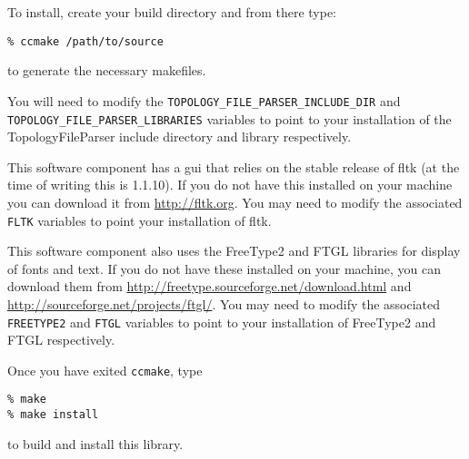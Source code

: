 To install, create your build directory and from there type:

\texttt{\% ccmake /path/to/source}

to generate the necessary makefiles. 

You will need to modify the 
\texttt{TOPOLOGY\_FILE\_PARSER\_INCLUDE\_DIR} and \texttt{TOPOLOGY\_FILE\_PARSER\_LIBRARIES} 
variables to point to your installation of the TopologyFileParser include directory and 
library respectively.

This software component has a gui that relies on the stable release of fltk (at the time of writing this
is 1.1.10).  If you do not have this installed on your machine you can download it from 
\url{http://fltk.org}.  You may need to modify the associated \texttt{FLTK} variables to point your installation of fltk.

This software component also uses the FreeType2 and FTGL libraries for display of fonts and text.  If you do not have
these installed on your machine, you can download them from \url{http://freetype.sourceforge.net/download.html} 
and \url{http://sourceforge.net/projects/ftgl/}.  You may need to modify the associated \texttt{FREETYPE2} 
and \texttt{FTGL} variables to point to your installation of FreeType2 and FTGL respectively.

Once you have exited \texttt{ccmake}, type 

\texttt{\% make}\\
\texttt{\% make install}

to build and install this library.

